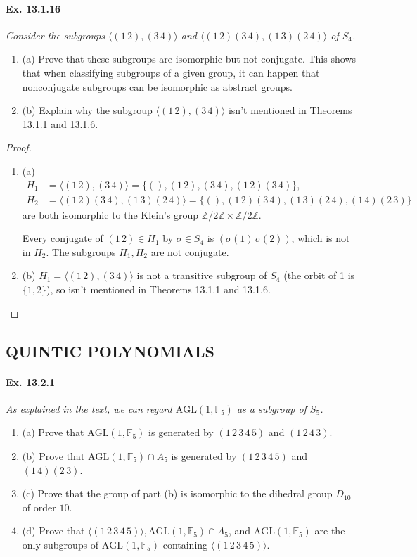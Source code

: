 \documentclass[11pt,a4paper]{article}
\newcommand{\be} {\begin{enumerate}}
\newcommand{\ee} {\end{enumerate}}
\newcommand{\Z}{\mathbb{Z}}
\newcommand{\F}{\mathbb{F}}
\begin{document}
\paragraph{Ex. 13.1.16}

{\it Consider the subgroups $\langle (1\,2),(3\,4) \rangle$ and $\langle (1\,2)(3\,4),(1\,3)(2\,4) \rangle$ of $S_4$.
\be
\item[(a)] Prove that these subgroups are isomorphic but not conjugate. This shows that when classifying subgroups of a given group, it can happen that nonconjugate subgroups can be isomorphic as abstract groups.
\item[(b)] Explain why the subgroup $\langle (1\,2),(3\,4) \rangle$ isn't mentioned in Theorems 13.1.1 and 13.1.6.
\ee
}

\begin{proof}
\be
\item[(a)]
\begin{align*}
H_1 &= \langle (1\,2),(3\,4) \rangle = \{(), (1\,2),(3\,4), (1\,2) (3\,4)\}, \\
 H_2 &= \langle (1\,2)(3\,4),(1\,3)(2\,4) \rangle = \{ (), (1\,2)(3\,4),(1\,3)(2\,4), (1\,4)(2\,3)\}
 \end{align*}
  are both isomorphic to the Klein's group $\Z/2\Z \times \Z/2\Z$.
  
Every conjugate of $(1\,2) \in H_1$ by $\sigma \in S_4$ is $(\sigma(1)\, \sigma(2)) $, which is not in $H_2$. The subgroups $H_1,H_2$ are not conjugate. 
\item[(b)] $H_1 = \langle (1\,2),(3\,4) \rangle$ is not a transitive subgroup of $S_4$ (the orbit of 1 is $\{1,2\}$), so isn't mentioned in Theorems 13.1.1 and 13.1.6.
\ee
\end{proof}

\subsection{QUINTIC POLYNOMIALS}

\paragraph{Ex. 13.2.1}

{\it As explained in the text, we can regard $\mathrm{AGL}(1,\F_5)$ as a subgroup of $S_5$.
\be
\item[(a)] Prove that $\mathrm{AGL}(1,\F_5)$ is generated by $(1\,2\,3\,4\,5)$ and $(1\,2\,4\,3)$.
\item[(b)] Prove that $\mathrm{AGL}(1,\F_5) \cap A_5$ is generated by $(1\,2\,3\,4\,5)$ and $(1\,4)(2\,3)$.
\item[(c)] Prove that the group of part (b) is isomorphic to the dihedral group $D_{10}$ of order $10$.
\item[(d)] Prove that $\langle (1\,2\,3\,4\,5)\rangle, \mathrm{AGL}(1,\F_5) \cap A_5$, and $\mathrm{AGL}(1,\F_5)$ are the only subgroups of $\mathrm{AGL}(1,\F_5)$ containing $\langle (1\,2\,3\,4\,5)\rangle$.
\ee
}
\end{document}
